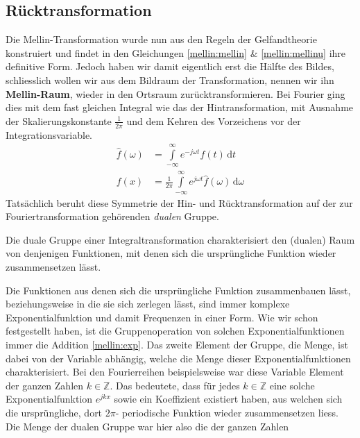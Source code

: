 \subsection{Rücktransformation
\label{mellin:subsection:ruecktransformation}}
Die Mellin-Transformation wurde nun aus den Regeln der Gelfandtheorie 
konstruiert und findet in den Gleichungen \eqref{mellin:mellin} \& 
\eqref{mellin:mellinu} ihre definitive Form.
Jedoch haben wir damit eigentlich erst die Hälfte des Bildes, schliesslich 
wollen wir aus dem Bildraum der Transformation, nennen wir ihn 
\textbf{Mellin-Raum}, wieder in den Ortsraum zurücktransformieren. 
Bei Fourier ging dies mit dem fast gleichen Integral wie das der 
Hintransformation, mit Ausnahme der Skalierungskonstante $\frac{1}{2\pi}$
und dem Kehren des Vorzeichens vor der Integrationsvariable.
\[
\begin{aligned}
    \hat{f}(\omega) &= \int\limits_{-\infty}^{\infty} 
    e^{-j\omega{}t} f(t) \,\mathrm{d}t \\
    f(x) &= \frac{1}{2\pi} \int\limits_{-\infty}^{\infty} 
    e^{j\omega t} \hat{f}(\omega) \,\mathrm{d}\omega
\end{aligned}
\]
Tatsächlich beruht diese Symmetrie der Hin- und Rücktransformation auf der 
zur Fouriertransformation gehörenden \emph{dualen} Gruppe.
\begin{definition}
    Die duale Gruppe einer Integraltransformation charakterisiert den 
    (dualen) Raum von denjenigen Funktionen, mit denen sich die 
    ursprüngliche Funktion wieder zusammensetzen lässt.
\end{definition}
Die Funktionen aus denen sich die ursprüngliche Funktion zusammenbauen 
lässt, beziehungsweise in die sie sich zerlegen lässt, 
sind immer komplexe Exponentialfunktion und damit Frequenzen in einer Form.
Wie wir schon festgestellt haben, ist die Gruppenoperation von solchen 
Exponentialfunktionen immer die Addition \eqref{mellin:exp}.
Das zweite Element der Gruppe, die Menge, ist dabei von der Variable 
abhängig, welche die Menge dieser Exponentialfunktionen charakterisiert.
Bei den Fourierreihen beispielsweise war diese Variable Element der ganzen 
Zahlen $k \in \mathbb{Z}$.
Das bedeutete, dass für jedes $k \in \mathbb{Z}$ eine solche 
Exponentialfunktion $e^{jkx}$ sowie ein Koeffizient existiert haben, aus 
welchen sich die ursprüngliche, dort $2\pi$- periodische Funktion wieder 
zusammensetzen liess.
Die Menge der dualen Gruppe war hier also die der ganzen Zahlen 
